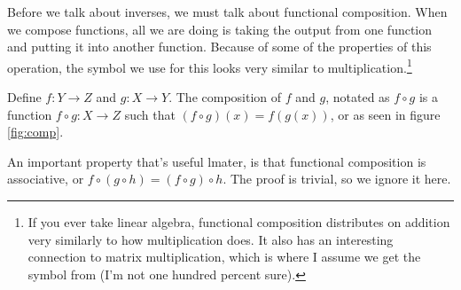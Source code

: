 \documentclass[11pt]{article}
\numberwithin{lemma}{section}
\numberwithin{equation}{section}
\numberwithin{define}{section}
\numberwithin{prop}{section}
\numberwithin{figure}{section}
\numberwithin{theorem}{section}
\numberwithin{ex}{section}
\begin{document}
Before we talk about inverses, we must talk about functional composition. When we compose functions, all we are doing is taking the output from one function and putting it into another function. Because of some of the properties of this operation, the symbol we use for this looks very similar to multiplication.\footnote{If you ever take linear algebra, functional composition distributes on addition very similarly to how multiplication does. It also has an interesting connection to matrix multiplication, which is where I assume we get the symbol from (I'm not one hundred percent sure).}

\begin{figure}[h]
\centering
{}
	\caption{}
	\label{fig:comp}
\end{figure}

\begin{define}
	Define $f:Y\to Z$ and $g:X\to Y$. The composition of $f$ and $g$, notated as $f\circ g$ is a function $f\circ g:X\to Z$ such that $(f\circ g)(x)=f(g(x))$, or as seen in figure \eqref{fig:comp}.
\end{define}

An important property that's useful lmater, is that functional composition is associative, or $f\circ (g\circ h)=(f\circ g) \circ h$. The proof is trivial, so we ignore it here.
\end{document}

